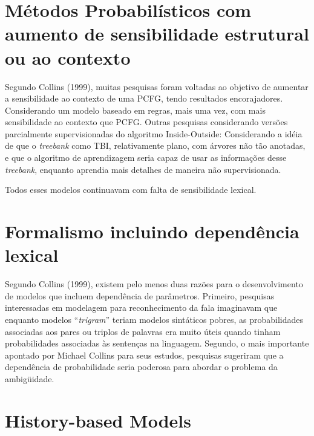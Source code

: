\section{Métodos Probabilísticos com aumento de sensibilidade estrutural ou ao contexto}
\label{sec:aumento_sensibilidade}

Segundo Collins (1999), muitas pesquisas foram voltadas ao objetivo de aumentar a sensibilidade ao contexto de uma PCFG, tendo resultados encorajadores.
Considerando um modelo baseado em regras, mais uma vez, com mais sensibilidade ao contexto que PCFG. Outras pesquisas considerando versões parcialmente supervisionadas do algoritmo Inside-Outside:
Considerando a idéia de que o \emph{treebank} como TBI, relativamente plano, com árvores não tão anotadas, e que o algoritmo de aprendizagem seria capaz de usar as informações desse \emph{treebank}, enquanto aprendia mais detalhes de maneira não supervisionada.

Todos esses modelos continuavam com falta de sensibilidade lexical.


\section{Formalismo incluindo dependência lexical}
\label{sec:dependencia_lexical}

Segundo Collins (1999), existem pelo menos duas razões para o desenvolvimento de modelos que incluem dependência de parâmetros. Primeiro, pesquisas interessadas em modelagem para reconhecimento da fala imaginavam que enquanto modelos ``\emph{trigram}'' teriam modelos sintáticos pobres, as probabilidades associadas aos pares ou triplos de palavras era muito úteis quando tinham probabilidades associadas às sentenças na linguagem.
Segundo, o mais importante apontado por Michael Collins para seus estudos, pesquisas sugeriram que a dependência de probabilidade seria poderosa para abordar o problema da ambigüidade.


\section{History-based Models}
\label{sec:hbm}


